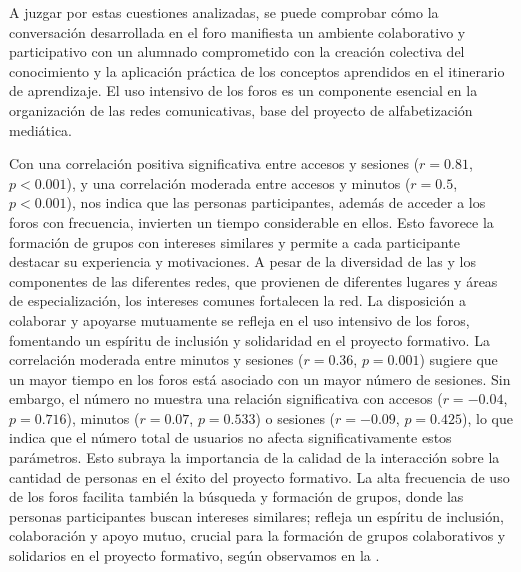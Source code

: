 A juzgar por estas cuestiones analizadas, se puede comprobar cómo la
conversación desarrollada en el foro manifiesta un ambiente colaborativo
y participativo con un alumnado comprometido con la creación colectiva
del conocimiento y la aplicación práctica de los conceptos aprendidos en
el itinerario de aprendizaje. El uso intensivo de los foros es un
componente esencial en la organización de las redes comunicativas, base
del proyecto de alfabetización mediática.

Con una correlación positiva significativa entre accesos y sesiones ($r =
0.81$, $p < 0.001$), y una correlación moderada entre accesos y
minutos ($r = 0.5$, $p < 0.001$), nos indica que las personas
participantes, además de acceder a los foros con frecuencia, invierten
un tiempo considerable en ellos. Esto favorece la formación de grupos
con intereses similares y permite a cada participante destacar su
experiencia y motivaciones. A pesar de la diversidad de las y los
componentes de las diferentes redes, que provienen de diferentes lugares
y áreas de especialización, los intereses comunes fortalecen la red. La
disposición a colaborar y apoyarse mutuamente se refleja en el uso
intensivo de los foros, fomentando un espíritu de inclusión y
solidaridad en el proyecto formativo. La correlación moderada entre
minutos y sesiones ($r = 0.36$, $p = 0.001$) sugiere que un mayor tiempo en
los foros está asociado con un mayor número de sesiones. Sin embargo, el
número no muestra una relación significativa con accesos ($r = -0.04$, $p =
0.716$), minutos ($r = 0.07$, $p = 0.533$) o sesiones ($r = -0.09$, $p = 0.425$),
lo que indica que el número total de usuarios no afecta
significativamente estos parámetros. Esto subraya la importancia de la
calidad de la interacción sobre la cantidad de personas en el éxito del
proyecto formativo. La alta frecuencia de uso de los foros facilita
también la búsqueda y formación de grupos, donde las personas
participantes buscan intereses similares; refleja un espíritu de
inclusión, colaboración y apoyo mutuo, crucial para la formación de
grupos colaborativos y solidarios en el proyecto formativo, según
observamos en la .

